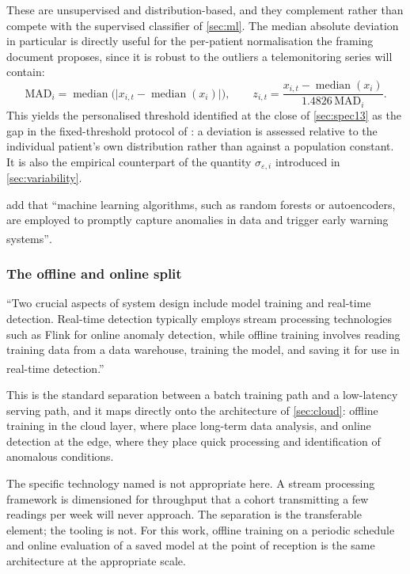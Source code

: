 \documentclass[12pt,a4paper,oneside]{report}
\newcommand{\bq}[1]{``#1''\textsuperscript{\dag}}
\begin{document}
These are unsupervised and distribution-based, and they complement rather than compete with the supervised classifier of \cref{sec:ml}. The median absolute deviation in particular is directly useful for the per-patient normalisation the framing document proposes, since it is robust to the outliers a telemonitoring series will contain:
\begin{equation}
  \mathrm{MAD}_i = \operatorname{median}\bigl(\lvert x_{i,t} - \operatorname{median}(x_i)\rvert\bigr),
  \qquad
  z_{i,t} = \frac{x_{i,t} - \operatorname{median}(x_i)}{1.4826\,\mathrm{MAD}_i}.
\end{equation}
This yields the personalised threshold identified at the close of \cref{sec:spec13} as the gap in the fixed-threshold protocol of \textcite{mihevc2025}: a deviation is assessed relative to the individual patient's own distribution rather than against a population constant. It is also the empirical counterpart of the quantity $\sigma_{\varepsilon,i}$ introduced in \cref{sec:variability}.

\Textcite{liu2025review} add that \bq{machine learning algorithms, such as random forests or autoencoders, are employed to promptly capture anomalies in data and trigger early warning systems}.

\subsubsection{The offline and online split}

\bq{Two crucial aspects of system design include model training and real-time detection. Real-time detection typically employs stream processing technologies such as Flink for online anomaly detection, while offline training involves reading training data from a data warehouse, training the model, and saving it for use in real-time detection.}

This is the standard separation between a batch training path and a low-latency serving path, and it maps directly onto the architecture of \cref{sec:cloud}: offline training in the cloud layer, where \textcite{mucchi2021} place long-term data analysis, and online detection at the edge, where they place quick processing and identification of anomalous conditions.

The specific technology named is not appropriate here. A stream processing framework is dimensioned for throughput that a cohort transmitting a few readings per week will never approach. The separation is the transferable element; the tooling is not. For this work, offline training on a periodic schedule and online evaluation of a saved model at the point of reception is the same architecture at the appropriate scale.
\end{document}
